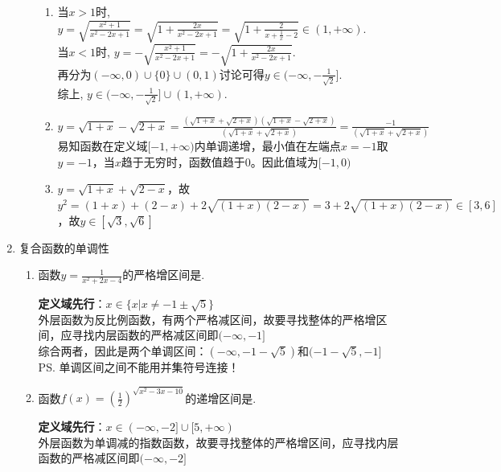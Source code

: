 \begin{enumerate}
\begin{enumerate}
\begin{jieda}
\begin{enumerate}
        \item 当$x>1$时, $y=\sqrt{\frac{x^2+1}{x^2-2x+1}}=\sqrt{1+\frac{2x}{x^2-2x+1}}=\sqrt{1+\frac{2}{x+\frac{1}{x}-2}}\in(1,+\infty)$. \\
        当$x<1$时, $y=-\sqrt{\frac{x^2+1}{x^2-2x+1}}=-\sqrt{1+\frac{2x}{x^2-2x+1}}$. \\
        再分为$(-\infty,0)\cup\{0\}\cup(0,1)$讨论可得$y\in(-\infty,-\frac{1}{\sqrt{2}}]$. \\
        综上, $y\in(-\infty,-\frac{1}{\sqrt{2}}]\cup(1,+\infty)$.
        \item $y = \sqrt{1+x} - \sqrt{2+x} = \frac{(\sqrt{1+x} + \sqrt{2+x})(\sqrt{1+x} - \sqrt{2+x})}{(\sqrt{1+x} + \sqrt{2+x})} = \frac{-1}{(\sqrt{1+x} + \sqrt{2+x})}$ \\
        易知函数在定义域$[-1, +\infty)$内单调递增，最小值在左端点$x = -1$取$y = -1$，当$x$趋于无穷时，函数值趋于0。因此值域为$[-1, 0)$
        \item $y = \sqrt{1+x} + \sqrt{2-x}$，故$y^2 = (1+x) + (2-x) + 2\sqrt{(1+x)(2-x)}  = 3 + 2\sqrt{(1+x)(2-x)} \in [3, 6]$，故$y \in [\sqrt{3}, \sqrt{6}]$
        \end{enumerate}
        \end{jieda}
    \end{enumerate}
    \item 复合函数的单调性
    \begin{enumerate}
        \item 函数$y = \frac{1}{x^2+2x-4}$的严格增区间是\blkda[5.5]{$(-\infty,-1-\sqrt{5})$和$(-1-\sqrt{5}, -1]$}. 
        \begin{jieda}
            \textbf{定义域先行}：$x \in \{x | x \neq -1\pm \sqrt{5}\}$ \\
            外层函数为反比例函数，有两个严格减区间，故要寻找整体的严格增区间，应寻找内层函数的严格减区间即$(-\infty,-1]$ \\
            综合两者，因此是两个单调区间：$(-\infty,-1-\sqrt{5})$和$(-1-\sqrt{5}, -1]$ \\
            \ps 单调区间之间不能用并集符号连接！
        \end{jieda}
        \item 函数$f(x) = (\frac{1}{2})^{\sqrt{x^2-3x-10}}$的递增区间是\blkda[3]{$(-\infty, -2]$}. 
        \begin{jieda}
            \textbf{定义域先行}：$x \in (-\infty, -2] \cup [5, +\infty)$ \\
            外层函数为单调减的指数函数，故要寻找整体的严格增区间，应寻找内层函数的严格减区间即$(-\infty,-2]$

\end{jieda}
\end{enumerate}
\end{enumerate}
